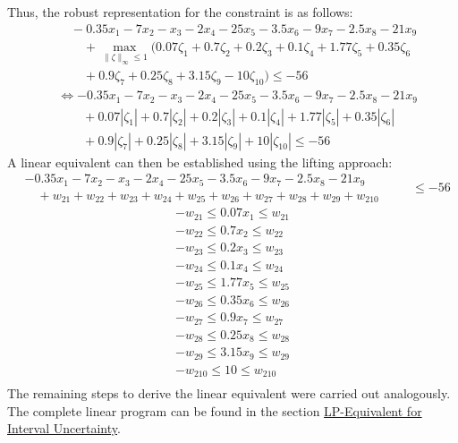 \documentclass[a4paper,12pt]{article}
\begin{document}
Thus, the robust representation for the constraint is as follows:
\[
\begin{aligned}
    &\quad-0.35x_1 - 7x_2 - x_3 - 2x_4 - 25x_5 - 3.5x_6 - 9x_7 - 2.5x_8 - 21x_9 \\
    &\qquad + \max_{\|\zeta\|_\infty \leq 1} \big( 0.07\zeta_1 + 0.7\zeta_2 + 0.2\zeta_3 + 0.1\zeta_4 + 1.77\zeta_5 +  0.35\zeta_6\\
    &\qquad + 0.9\zeta_7 + 0.25\zeta_8 + 3.15\zeta_9 - 10\zeta_{10} \big) \leq -56
\end{aligned}
\]
\[
\begin{aligned}
    &\Leftrightarrow -0.35x_1 - 7x_2 - x_3 - 2x_4 - 25x_5 - 3.5x_6 - 9x_7 - 2.5x_8 - 21x_9 \\
    &\qquad + 0.07|\zeta_1| + 0.7|\zeta_2| + 0.2|\zeta_3| + 0.1|\zeta_4| + 1.77|\zeta_5| + 0.35|\zeta_6| \\
    &\qquad + 0.9|\zeta_7| + 0.25|\zeta_8| + 3.15|\zeta_9| + 10|\zeta_{10}| \leq -56
\end{aligned}
\]
\newpage
A linear equivalent can then be established using the lifting approach:
\[
\begin{aligned}
    &-0.35x_1 - 7x_2 - x_3 - 2x_4 - 25x_5 - 3.5x_6 - 9x_7 - 2.5x_8 - 21x_9 \\
    &\quad + w_{21} + w_{22} + w_{23} + w_{24} + w_{25} + w_{26} + w_{27}+ w_{28}+ w_{29}+ w_{210}
\end{aligned}
\begin{aligned}
    &\quad \leq -56
\end{aligned}
\]
\[
\begin{aligned} 
    -w_{21} \leq 0.07x_1 \leq w_{21} \\
    -w_{22} \leq 0.7x_2 \leq w_{22} \\
    -w_{23} \leq 0.2x_3 \leq w_{23} \\
    -w_{24} \leq 0.1x_4 \leq w_{24} \\
    -w_{25} \leq 1.77x_5 \leq w_{25} \\
    -w_{26} \leq 0.35x_6 \leq w_{26} \\
    -w_{27} \leq 0.9x_7 \leq w_{27} \\
    -w_{28} \leq 0.25x_8 \leq w_{28} \\
    -w_{29} \leq 3.15x_9 \leq w_{29} \\
    -w_{210} \leq 10 \leq w_{210} \\
\end{aligned}
\]
The remaining steps to derive the linear equivalent were carried out analogously. The complete linear program can be found in the section \hyperref[sec:lp-equivalent-interval]{LP-Equivalent for Interval Uncertainty}.
\end{document}
